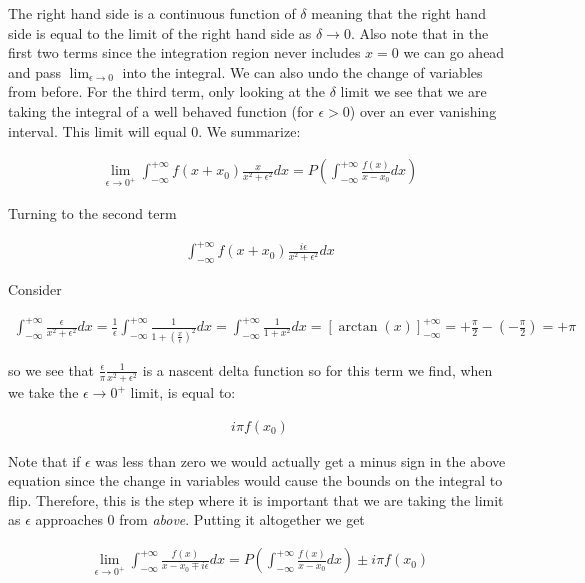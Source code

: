 \documentclass[12pt]{article}
\begin{document}
The right hand side is a continuous function of $\delta$ meaning that the right hand side is equal to the limit of the right hand side as $\delta \rightarrow 0$. Also note that in the first two terms since the integration region never includes $x=0$ we can go ahead and pass $\lim_{\epsilon \rightarrow 0}$ into the integral. We can also undo the change of variables from before. For the third term, only looking at the $\delta$ limit we see that we are taking the integral of a well behaved function (for $\epsilon>0$) over an ever vanishing interval. This limit will equal $0$. We summarize:

\begin{align}
\lim_{\epsilon \rightarrow 0^+} \int_{-\infty}^{+\infty} f(x+x_0) \frac{x}{x^2+\epsilon^2} dx = P\left(\int_{-\infty}^{+\infty}\frac{f(x)}{x-x_0} dx\right)
\end{align}

Turning to the second term

\begin{align}
\int_{-\infty}^{+\infty} f(x+x_0) \frac{i \epsilon}{x^2+\epsilon^2} dx
\end{align}

Consider

\begin{align}
\int_{-\infty}^{+\infty} \frac{\epsilon}{x^2+\epsilon^2} dx = \frac{1}{\epsilon} \int_{-\infty}^{+\infty} \frac{1}{1+\left(\frac{x}{\epsilon}\right)^2} dx = \int_{-\infty}^{+\infty} \frac{1}{1+x^2} dx = \left[\arctan(x)\right]_{-\infty}^{+\infty} = +\frac{\pi}{2} - \left(-\frac{\pi}{2}\right) = +\pi
\end{align}

so we see that $\frac{\epsilon}{\pi} \frac{1}{x^2+\epsilon^2}$ is a nascent delta function so for this term we find, when we take the $\epsilon \rightarrow 0^+$ limit, is equal to:

\begin{align}
i\pi f(x_0)
\end{align}

Note that if $\epsilon$ was less than zero we would actually get a minus sign in the above equation since the change in variables would cause the bounds on the integral to flip. Therefore, this is the step where it is important that we are taking the limit as $\epsilon$ approaches $0$ from \textit{above}.
Putting it altogether we get 

\begin{align}
\lim_{\epsilon \rightarrow 0^+} \int_{-\infty}^{+\infty} \frac{f(x)}{x-x_0 \mp i \epsilon} dx = P\left(\int_{-\infty}^{+\infty} \frac{f(x)}{x-x_0} dx \right) \pm i \pi f(x_0)
\end{align}
\end{document}
